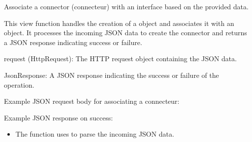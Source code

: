 \documentclass[letterpaper,10pt,english]{sphinxmanual}
\begin{document}
\begin{fulllineitems}
\label{\detokenize{app:app.views.associate_connecteur}}
\pysigstartsignatures
{}
\pysigstopsignatures
\sphinxAtStartPar
Associate a connector (connecteur) with an interface based on the provided data.

\sphinxAtStartPar
This view function handles the creation of a  object and associates it 
with an  object. It processes the incoming JSON data to create the connector 
and returns a JSON response indicating success or failure.
\begin{description}
\sphinxAtStartPar
request (HttpRequest): The HTTP request object containing the JSON data.

\sphinxAtStartPar
JsonResponse: A JSON response indicating the success or failure of the operation.

\sphinxAtStartPar
Example JSON request body for associating a connecteur:

\begin{sphinxVerbatim}[commandchars=\\\{\}]
\end{sphinxVerbatim}

\sphinxAtStartPar
Example JSON response on success:

\begin{sphinxVerbatim}[commandchars=\\\{\}]
\end{sphinxVerbatim}

\begin{itemize}
\item {} 
\sphinxAtStartPar
The function uses  to parse the incoming JSON data.


\end{itemize}
\end{description}
\end{fulllineitems}
\end{document}

